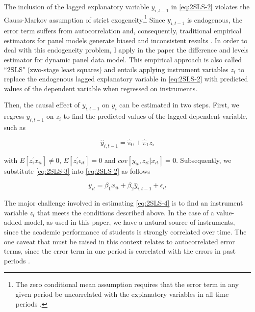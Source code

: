 \documentclass[a4paper, 12pt]{article}
\begin{document}
{The inclusion of the lagged explanatory variable $y_{i,t-1}$ in \eqref{eq:2SLS-2} violates the Gauss-Markov assumption of strict exogeneity.\footnote{The zero conditional mean assumption requires that the error term in any given period be uncorrelated with the explanatory variables in all time periods \citep{wooldridge2016introductory, wooldridge2001applications}.} Since $y_{i,t-1}$ is endogenous, the error term suffers from autocorrelation and, consequently, traditional empirical estimators for panel models generate biased and inconsistent results \citep[see e.g.][]{jessen2018important, wooldridge2016introductory, roodman2009xtabond2, baltagi2008econometric}. In order to deal with this endogeneity problem, I apply in the paper the \citet{anderson1982formulation} difference and levels estimator for dynamic panel data model. This empirical approach is also called ``2SLS" (zwo-stage least squares) and entails applying instrument variables $z_i$ to replace the endogenous lagged explanatory variable in \eqref{eq:2SLS-2} with predicted values of the dependent variable when regressed on instruments. 

Then, the causal effect of $y_{i,t-1}$ on $y_{i}$ can be estimated in two steps. First, we regress $y_{i,t-1}$ on $z_i$ to find the predicted values of the lagged dependent variable, such as

\begin{equation} \label{eq:2SLS-3}
\widehat{y}_{i,t-1} = \widehat{\pi}_0 + \widehat{\pi}_1 z_i 
\end{equation}

with $E[z_i^{\prime} x_{it}] \neq 0$, $E[z_i^{\prime} \epsilon_{it}] = 0$ and $cov[y_{it},z_{it} \vert x_{it}] = 0$. Subsequently, we substitute \eqref{eq:2SLS-3} into \eqref{eq:2SLS-2} as follows

\begin{equation} \label{eq:2SLS-4}
y_{it} = \beta_1 x_{it} + \beta_2 \widehat{y}_{i,t-1} + \epsilon_{it} 
\end{equation}


The major challenge involved in estimating \eqref{eq:2SLS-4} is to find an instrument variable $z_i$ that meets the conditions described above. In the case of a value-added model, as used in this paper, we have a natural source of instruments, since the academic performance of students is strongly correlated over time. The one caveat that must be raised in this context relates to autocorrelated error terms, since the error term in one period is correlated with the errors in past periods \citep{wooldridge2016introductory}. 

}
\end{document}

